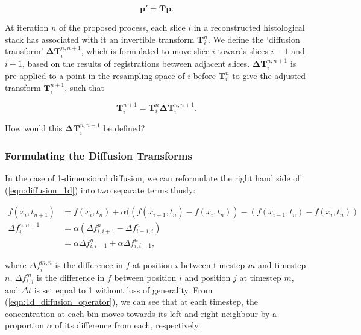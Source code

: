   		\begin{equation}
  			\mathbf{p'} = \mathbf{Tp}.
  		\end{equation}
      
  		At iteration $n$ of the proposed process, each slice $i$ in a reconstructed histological stack has associated with it an invertible transform $\mathbf{T}_i^n$. We define the `diffusion transform' $\mathbf{\Delta T}_i^{n,n+1}$, which is formulated to move slice $i$ towards slices $i-1$ and $i+1$, based on the results of registrations between adjacent slices. $\mathbf{\Delta T}_i^{n,n+1}$ is pre-applied to a point in the resampling space of $i$ before $\mathbf{T}_i^n$ to give the adjusted transform $\mathbf{T}_i^{n+1}$, such that
		  
    	\begin{equation}
  			\mathbf{T}_i^{n+1} = \mathbf{T}_i^n \mathbf{\Delta T}_i^{n,n+1}. \label{eqn:adjusted_transforms}
  		\end{equation}
		  
	  How would this $\mathbf{\Delta T}_i^{n,n+1}$ be defined?
		
    
    \subsubsection{Formulating the Diffusion Transforms} %
    \label{ssub:formulating_the_diffusion_transforms}
      In the case of 1-dimensional diffusion, we can reformulate the right hand side of (\ref{eqn:diffusion_1d}) into two separate terms thusly:
     
	  \begin{align}
	    f(x_i, t_{n+1}) &= f(x_i, t_n) + \alpha ((f(x_{i+1}, t_n) - f(x_i, t_n)) - (f(x_{i-1}, t_n) - f(x_i, t_n)) \\
			\Delta f_i^{n,n+1} &= \alpha (\Delta f_{i,i+1}^n - \Delta f_{i-1,i}^n) \\
			                   &= \alpha \Delta f_{i,i-1}^n + \alpha \Delta f_{i,i+1}^n, \label{eqn:1d_diffusion_operator}
		\end{align}
		
    where $\Delta f_i^{m,n}$ is the difference in $f$ at position $i$ between timestep $m$ and timestep $n$, $\Delta f_{i,j}^m$ is the difference in $f$ between position $i$ and position $j$ at timestep $m$, and $\Delta t$ is set equal to 1 without loss of generality. From (\ref{eqn:1d_diffusion_operator}), we can see that at each timestep, the concentration at each bin moves towards its left and right neighbour by a proportion $\alpha$ of its difference from each, respectively.
		
